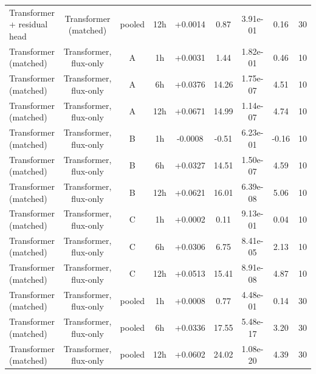 \begin{tabular}{lcccccccc}
Transformer + residual head & Transformer (matched) & pooled & 12h & +0.0014 & 0.87 & 3.91e-01 & 0.16 & 30 \\
Transformer (matched) & Transformer, flux-only & A & 1h & +0.0031 & 1.44 & 1.82e-01 & 0.46 & 10 \\
Transformer (matched) & Transformer, flux-only & A & 6h & +0.0376 & 14.26 & 1.75e-07 & 4.51 & 10 \\
Transformer (matched) & Transformer, flux-only & A & 12h & +0.0671 & 14.99 & 1.14e-07 & 4.74 & 10 \\
Transformer (matched) & Transformer, flux-only & B & 1h & -0.0008 & -0.51 & 6.23e-01 & -0.16 & 10 \\
Transformer (matched) & Transformer, flux-only & B & 6h & +0.0327 & 14.51 & 1.50e-07 & 4.59 & 10 \\
Transformer (matched) & Transformer, flux-only & B & 12h & +0.0621 & 16.01 & 6.39e-08 & 5.06 & 10 \\
Transformer (matched) & Transformer, flux-only & C & 1h & +0.0002 & 0.11 & 9.13e-01 & 0.04 & 10 \\
Transformer (matched) & Transformer, flux-only & C & 6h & +0.0306 & 6.75 & 8.41e-05 & 2.13 & 10 \\
Transformer (matched) & Transformer, flux-only & C & 12h & +0.0513 & 15.41 & 8.91e-08 & 4.87 & 10 \\
Transformer (matched) & Transformer, flux-only & pooled & 1h & +0.0008 & 0.77 & 4.48e-01 & 0.14 & 30 \\
Transformer (matched) & Transformer, flux-only & pooled & 6h & +0.0336 & 17.55 & 5.48e-17 & 3.20 & 30 \\
Transformer (matched) & Transformer, flux-only & pooled & 12h & +0.0602 & 24.02 & 1.08e-20 & 4.39 & 30 \\
\bottomrule
\end{tabular}
